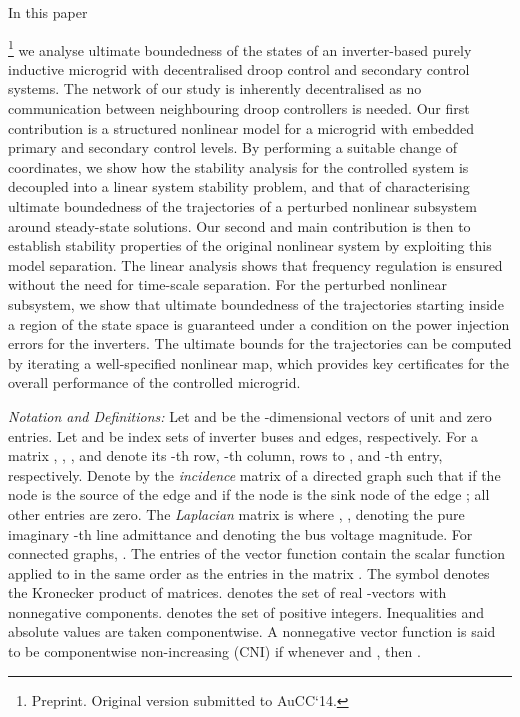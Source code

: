 \documentclass[letter, 10pt, conference]{ieeeconf}
\newcommand{\1}{\mathbf{1}}
\newcommand{\0}{\mathbf{0}}
\begin{document}
In this paper{\footnote{Preprint. Original version submitted to AuCC`14.}
 we analyse ultimate boundedness of the states of an
inverter-based purely inductive microgrid with decentralised droop
control and secondary control systems.
The network of our study is inherently decentralised as no communication between
neighbouring droop controllers is needed.
Our first contribution is a structured nonlinear model for a microgrid
with embedded primary and secondary control levels.  
By performing a suitable change of coordinates, we show how the
stability analysis for the controlled system is decoupled into a
linear system stability problem, and that of characterising
ultimate boundedness of the trajectories of a perturbed nonlinear
subsystem around steady-state solutions. Our second and main
contribution is then to establish stability properties of the original
nonlinear system by exploiting this model separation.  The linear
analysis shows that frequency regulation
is ensured without the need for time-scale separation.  For the
perturbed nonlinear subsystem, we show that ultimate boundedness of
the trajectories starting inside a region of the state space is
guaranteed under a condition on the power injection errors for the
inverters. The ultimate bounds for the trajectories can be computed by
iterating a well-specified nonlinear map, which provides key
certificates for the overall performance of the controlled microgrid.





\emph{Notation and Definitions:} Let  and 
be the -dimensional vectors of unit and zero entries.  Let 
and  be 
index sets of inverter buses and edges, respectively.  For a matrix
, , ,  and  denote
its -th row, -th column, rows  to , and -th entry,
respectively.  Denote by  the \emph{incidence}
matrix of a directed graph such that  if the node  is
the source of the edge  and  if the node  is the
sink node of the edge ; all other entries are zero.  The
\emph{Laplacian} matrix is  where
, ,  denoting the pure imaginary -th line admittance and
 denoting the bus voltage magnitude.  For connected graphs, . The entries of the  vector function
 contain the scalar
function  applied to  in the same order
as the entries in the matrix . The symbol  denotes the
Kronecker product of matrices.   denotes the set of real -vectors with nonnegative
components.  denotes the set of positive integers.
Inequalities and absolute values are taken componentwise.
A nonnegative vector function  is said to
be componentwise non-increasing (CNI) if whenever
 and , then .




}
\end{document}
